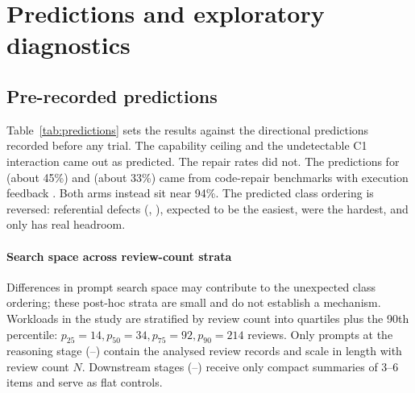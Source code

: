 \section{Predictions and exploratory diagnostics}
\label{app:diagnostics}
\subsection{Pre-recorded predictions}

Table~\ref{tab:predictions} sets the results against the directional
predictions recorded before any trial. The capability ceiling and the
undetectable C1 interaction came out as predicted. The repair rates did not.
The predictions for  (about 45\%) and  (about 33\%) came from
code-repair benchmarks with execution feedback
\citep{arimbur2026,chen2024selfdebug}. Both arms instead sit near 94\%. The
predicted class ordering is reversed: referential defects (, ),
expected to be the easiest, were the hardest, and only  has real
headroom.

\paragraph{Search space across review-count strata}
Differences in prompt search space may contribute to the unexpected class ordering; these post-hoc strata are small and do not establish a mechanism. Workloads in the study are
stratified by review count into quartiles plus the 90th percentile:
$p_{25}=14, p_{50}=34, p_{75}=92, p_{90}=214$ reviews. Only prompts at the
reasoning stage (--) contain the analysed review records and scale in
length with review count $N$. Downstream stages (--) receive only
compact summaries of 3--6 items and serve as flat controls.

